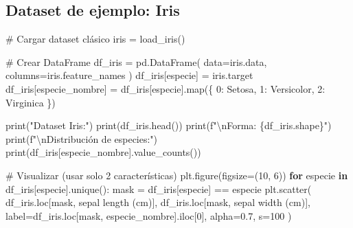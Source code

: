 \documentclass[
  doc,
  floatsintext,
  longtable,
  a4paper,
  nolmodern,
  notxfonts,
  notimes,
  12pt,
  colorlinks=true,linkcolor=blue,citecolor=blue,urlcolor=blue]{apa7}
\newenvironment{Shaded}{\begin{snugshade}}{\end{snugshade}}
\newcommand{\BuiltInTok}[1]{\textcolor[rgb]{0.00,0.23,0.31}{#1}}
\newcommand{\CharTok}[1]{\textcolor[rgb]{0.13,0.47,0.30}{#1}}
\newcommand{\CommentTok}[1]{\textcolor[rgb]{0.37,0.37,0.37}{#1}}
\newcommand{\ControlFlowTok}[1]{\textcolor[rgb]{0.00,0.23,0.31}{\textbf{#1}}}
\newcommand{\DecValTok}[1]{\textcolor[rgb]{0.68,0.00,0.00}{#1}}
\newcommand{\FloatTok}[1]{\textcolor[rgb]{0.68,0.00,0.00}{#1}}
\newcommand{\KeywordTok}[1]{\textcolor[rgb]{0.00,0.23,0.31}{\textbf{#1}}}
\newcommand{\NormalTok}[1]{\textcolor[rgb]{0.00,0.23,0.31}{#1}}
\newcommand{\OperatorTok}[1]{\textcolor[rgb]{0.37,0.37,0.37}{#1}}
\newcommand{\SpecialCharTok}[1]{\textcolor[rgb]{0.37,0.37,0.37}{#1}}
\newcommand{\SpecialStringTok}[1]{\textcolor[rgb]{0.13,0.47,0.30}{#1}}
\newcommand{\StringTok}[1]{\textcolor[rgb]{0.13,0.47,0.30}{#1}}
\begin{document}
\subsection{Dataset de ejemplo: Iris}\label{dataset-de-ejemplo-iris}

\begin{Shaded}
\begin{Highlighting}[]
\CommentTok{\# Cargar dataset clásico}
\NormalTok{iris }\OperatorTok{=}\NormalTok{ load\_iris()}

\CommentTok{\# Crear DataFrame}
\NormalTok{df\_iris }\OperatorTok{=}\NormalTok{ pd.DataFrame(}
\NormalTok{    data}\OperatorTok{=}\NormalTok{iris.data,}
\NormalTok{    columns}\OperatorTok{=}\NormalTok{iris.feature\_names}
\NormalTok{)}
\NormalTok{df\_iris[}\StringTok{\textquotesingle{}especie\textquotesingle{}}\NormalTok{] }\OperatorTok{=}\NormalTok{ iris.target}
\NormalTok{df\_iris[}\StringTok{\textquotesingle{}especie\_nombre\textquotesingle{}}\NormalTok{] }\OperatorTok{=}\NormalTok{ df\_iris[}\StringTok{\textquotesingle{}especie\textquotesingle{}}\NormalTok{].}\BuiltInTok{map}\NormalTok{(\{}
    \DecValTok{0}\NormalTok{: }\StringTok{\textquotesingle{}Setosa\textquotesingle{}}\NormalTok{,}
    \DecValTok{1}\NormalTok{: }\StringTok{\textquotesingle{}Versicolor\textquotesingle{}}\NormalTok{, }
    \DecValTok{2}\NormalTok{: }\StringTok{\textquotesingle{}Virginica\textquotesingle{}}
\NormalTok{\})}

\BuiltInTok{print}\NormalTok{(}\StringTok{"Dataset Iris:"}\NormalTok{)}
\BuiltInTok{print}\NormalTok{(df\_iris.head())}
\BuiltInTok{print}\NormalTok{(}\SpecialStringTok{f"}\CharTok{\textbackslash{}n}\SpecialStringTok{Forma: }\SpecialCharTok{\{}\NormalTok{df\_iris}\SpecialCharTok{.}\NormalTok{shape}\SpecialCharTok{\}}\SpecialStringTok{"}\NormalTok{)}
\BuiltInTok{print}\NormalTok{(}\SpecialStringTok{f"}\CharTok{\textbackslash{}n}\SpecialStringTok{Distribución de especies:"}\NormalTok{)}
\BuiltInTok{print}\NormalTok{(df\_iris[}\StringTok{\textquotesingle{}especie\_nombre\textquotesingle{}}\NormalTok{].value\_counts())}

\CommentTok{\# Visualizar (usar solo 2 características)}
\NormalTok{plt.figure(figsize}\OperatorTok{=}\NormalTok{(}\DecValTok{10}\NormalTok{, }\DecValTok{6}\NormalTok{))}
\ControlFlowTok{for}\NormalTok{ especie }\KeywordTok{in}\NormalTok{ df\_iris[}\StringTok{\textquotesingle{}especie\textquotesingle{}}\NormalTok{].unique():}
\NormalTok{    mask }\OperatorTok{=}\NormalTok{ df\_iris[}\StringTok{\textquotesingle{}especie\textquotesingle{}}\NormalTok{] }\OperatorTok{==}\NormalTok{ especie}
\NormalTok{    plt.scatter(}
\NormalTok{        df\_iris.loc[mask, }\StringTok{\textquotesingle{}sepal length (cm)\textquotesingle{}}\NormalTok{],}
\NormalTok{        df\_iris.loc[mask, }\StringTok{\textquotesingle{}sepal width (cm)\textquotesingle{}}\NormalTok{],}
\NormalTok{        label}\OperatorTok{=}\NormalTok{df\_iris.loc[mask, }\StringTok{\textquotesingle{}especie\_nombre\textquotesingle{}}\NormalTok{].iloc[}\DecValTok{0}\NormalTok{],}
\NormalTok{        alpha}\OperatorTok{=}\FloatTok{0.7}\NormalTok{,}
\NormalTok{        s}\OperatorTok{=}\DecValTok{100}
\NormalTok{    )}


\end{Highlighting}
\end{Shaded}
\end{document}
